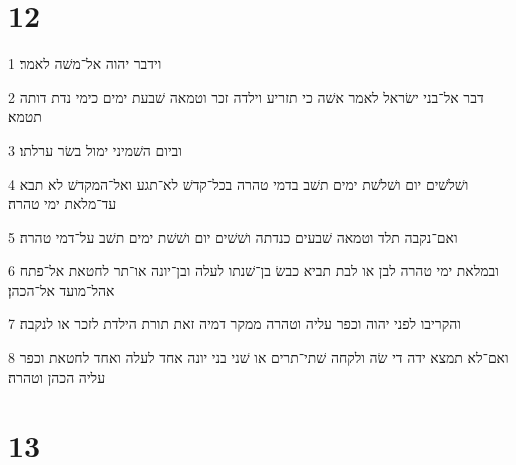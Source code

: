 \chapter{12}

\par 1 וידבר יהוה אל־משׁה לאמר׃
\par 2 דבר אל־בני ישׂראל לאמר אשׁה כי תזריע וילדה זכר וטמאה שׁבעת ימים כימי נדת דותה תטמא׃
\par 3 וביום השׁמיני ימול בשׂר ערלתו׃
\par 4 ושׁלשׁים יום ושׁלשׁת ימים תשׁב בדמי טהרה בכל־קדשׁ לא־תגע ואל־המקדשׁ לא תבא עד־מלאת ימי טהרה׃
\par 5 ואם־נקבה תלד וטמאה שׁבעים כנדתה ושׁשׁים יום ושׁשׁת ימים תשׁב על־דמי טהרה׃
\par 6 ובמלאת ימי טהרה לבן או לבת תביא כבשׂ בן־שׁנתו לעלה ובן־יונה או־תר לחטאת אל־פתח אהל־מועד אל־הכהן׃
\par 7 והקריבו לפני יהוה וכפר עליה וטהרה ממקר דמיה זאת תורת הילדת לזכר או לנקבה׃
\par 8 ואם־לא תמצא ידה די שׂה ולקחה שׁתי־תרים או שׁני בני יונה אחד לעלה ואחד לחטאת וכפר עליה הכהן וטהרה׃

\chapter{13}

